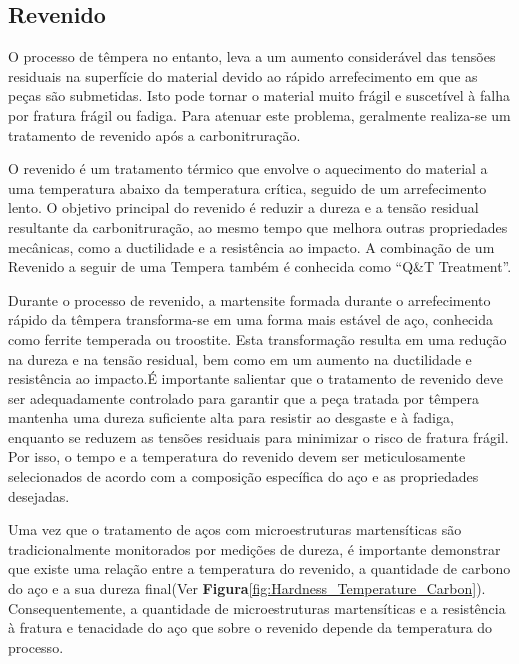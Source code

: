 \subsection{Revenido} \label{ssec:soa_tratamentos_revenido}

O processo de têmpera no entanto, leva a um aumento considerável das tensões residuais na superfície do material devido ao rápido arrefecimento em que as peças são submetidas. Isto pode tornar o material muito frágil e suscetível à falha por fratura frágil ou fadiga. Para atenuar este problema, geralmente realiza-se um tratamento de revenido após a carbonitruração.
\par
O revenido é um tratamento térmico que envolve o aquecimento do material a uma temperatura abaixo da temperatura crítica, seguido de um arrefecimento lento. O objetivo principal do revenido é reduzir a dureza e a tensão residual resultante da carbonitruração, ao mesmo tempo que melhora outras propriedades mecânicas, como a ductilidade e a resistência ao impacto\cite{Krauss2015}. A combinação de um Revenido a seguir de uma Tempera também é conhecida como “Q\&T Treatment”.
\par
Durante o processo de revenido, a martensite formada durante o arrefecimento rápido da têmpera transforma-se em uma forma mais estável de aço, conhecida como ferrite temperada ou troostite. Esta transformação resulta em uma redução na dureza e na tensão residual, bem como em um aumento na ductilidade e resistência ao impacto\cite{Krauss2001}.É importante salientar que o tratamento de revenido deve ser adequadamente controlado para garantir que a peça tratada por têmpera mantenha uma dureza suficiente alta para resistir ao desgaste e à fadiga, enquanto se reduzem as tensões residuais para minimizar o risco de fratura frágil. Por isso, o tempo e a temperatura do revenido devem ser meticulosamente selecionados de acordo com a composição específica do aço e as propriedades desejadas.
\par
Uma vez que o tratamento de aços com microestruturas martensíticas são tradicionalmente monitorados por medições de dureza, é importante demonstrar que existe uma relação entre a temperatura do revenido, a quantidade de carbono do aço e a sua dureza final(Ver \textbf{Figura}\ref{fig:Hardness_Temperature_Carbon}). Consequentemente, a quantidade de microestruturas martensíticas e a resistência à fratura e tenacidade do aço que sobre o revenido depende da temperatura do processo.
